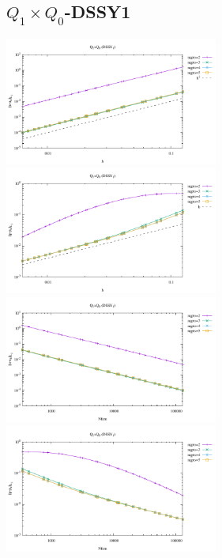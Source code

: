 \subsection*{$Q_1\times Q_0$-DSSY1}
\begin{center}
\includegraphics[width=7cm]{python_codes/fieldstone_120/results/DSSY1Q0-velocity-h.pdf}
\includegraphics[width=7cm]{python_codes/fieldstone_120/results/DSSY1Q0-pressure-h.pdf}
\includegraphics[width=7cm]{python_codes/fieldstone_120/results/DSSY1Q0-velocity-Nfem.pdf}
\includegraphics[width=7cm]{python_codes/fieldstone_120/results/DSSY1Q0-pressure-Nfem.pdf}
\end{center}

